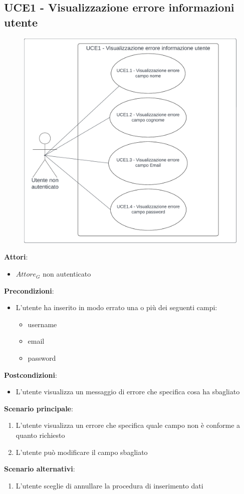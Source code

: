 \subsection{UCE1 - Visualizzazione errore informazioni utente}\label{usecase:e_1}
\begin{figure}[H]
    \centering
    \includegraphics[width=0.75\linewidth]{ucd/UCED1.png}
\end{figure}
\textbf{Attori}:
\begin{itemize}
    \item $\textit{Attore}_G$ non autenticato
\end{itemize}
\textbf{Precondizioni}:
\begin{itemize}
    \item L'utente ha inserito in modo errato una o più dei seguenti campi:
    \begin{itemize}
        \item username
        \item email
        \item password
    \end{itemize}
\end{itemize}
\textbf{Postcondizioni}:
\begin{itemize}
    \item L'utente visualizza un messaggio di errore che specifica cosa ha sbagliato
\end{itemize}
\textbf{Scenario principale}:
\begin{enumerate}
    \item L'utente visualizza un errore che specifica quale campo non è conforme a quanto richiesto
    \item L'utente può modificare il campo sbagliato
\end{enumerate}
\textbf{Scenario alternativi}:
\begin{enumerate}
    \item L'utente sceglie di annullare la procedura di inserimento dati
\end{enumerate}




\newpage